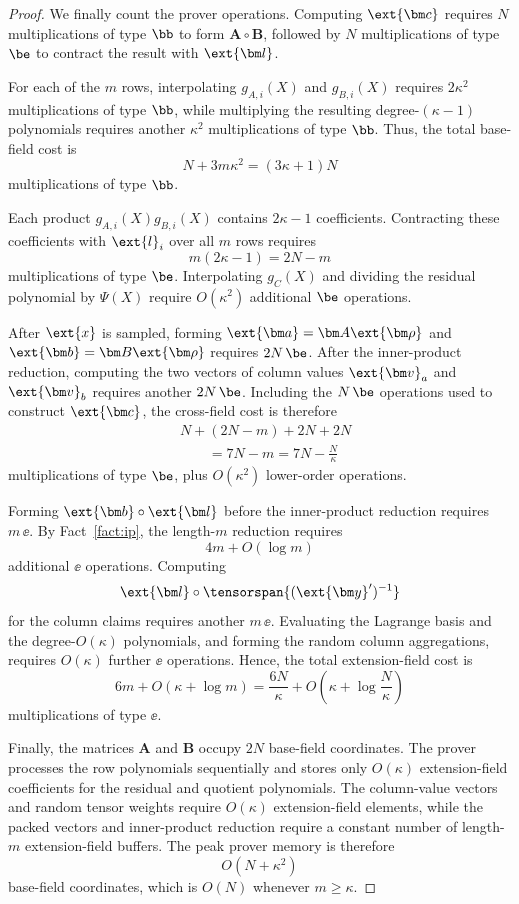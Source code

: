 \begin{proof}
We finally count the prover operations. Computing
\(\ext{\bm c}\) requires \(N\) multiplications of type \(\bb\)
to form \(\bm A\circ\bm B\), followed by \(N\) multiplications
of type \(\be\) to contract the result with
\(\ext{\bm l}\).

For each of the \(m\) rows, interpolating
\(g_{A,i}(X)\) and \(g_{B,i}(X)\) requires
\(2\kappa^2\) multiplications of type \(\bb\), while multiplying
the resulting degree-\((\kappa-1)\) polynomials requires another
\(\kappa^2\) multiplications of type \(\bb\). Thus, the total
base-field cost is
\[
    N+3m\kappa^2
    =
    (3\kappa+1)N
\]
multiplications of type \(\bb\).

Each product
\(g_{A,i}(X)g_{B,i}(X)\) contains \(2\kappa-1\)
coefficients. Contracting these coefficients with
\(\ext{l}_i\) over all \(m\) rows requires
\[
    m(2\kappa-1)
    =
    2N-m
\]
multiplications of type \(\be\). Interpolating \(g_C(X)\) and
dividing the residual polynomial by \(\Psi(X)\) require
\(O(\kappa^2)\) additional \(\be\) operations.

After \(\ext{x}\) is sampled, forming
\(\ext{\bm a}=\bm A\ext{\bm\rho}\) and
\(\ext{\bm b}=\bm B\ext{\bm\rho}\) requires \(2N\,\be\).
After the inner-product reduction, computing the two vectors of
column values \(\ext{\bm v}_a\) and \(\ext{\bm v}_b\) requires
another \(2N\,\be\). Including the \(N\,\be\) operations used to
construct \(\ext{\bm c}\), the cross-field cost is therefore
\[
\begin{aligned}
    &N+(2N-m)+2N+2N\\
    &\qquad=
    7N-m
    =
    7N-\frac{N}{\kappa}
\end{aligned}
\]
multiplications of type \(\be\), plus
\(O(\kappa^2)\) lower-order operations.

Forming
\(\ext{\bm b}\circ\ext{\bm l}\) before the inner-product
reduction requires \(m\,\ee\). By Fact~\ref{fact:ip}, the
length-\(m\) reduction requires
\[
    4m+O(\log m)
\]
additional \(\ee\) operations. Computing
\[
    \ext{\bm l}
    \circ
    \tensorspan{(\ext{\bm y}')^{-1}}
\]
for the column claims requires another \(m\,\ee\).
Evaluating the Lagrange basis and the degree-\(O(\kappa)\)
polynomials, and forming the random column aggregations, requires
\(O(\kappa)\) further \(\ee\) operations. Hence, the total
extension-field cost is
\[
    6m+O(\kappa+\log m)
    =
    \frac{6N}{\kappa}
    +
    O\left(
        \kappa+\log\frac{N}{\kappa}
    \right)
\]
multiplications of type \(\ee\).

Finally, the matrices \(\bm A\) and \(\bm B\) occupy \(2N\)
base-field coordinates. The prover processes the row polynomials
sequentially and stores only \(O(\kappa)\) extension-field
coefficients for the residual and quotient polynomials. The
column-value vectors and random tensor weights require
\(O(\kappa)\) extension-field elements, while the packed vectors
and inner-product reduction require a constant number of
length-\(m\) extension-field buffers. The peak prover memory is
therefore
\[
    O(N+\kappa^2)
\]
base-field coordinates, which is \(O(N)\) whenever
\(m\geq\kappa\).
\end{proof}

